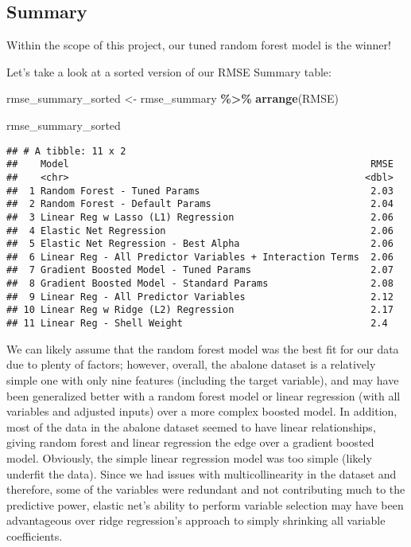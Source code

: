 \documentclass[
]{article}
\newenvironment{Shaded}{\begin{snugshade}}{\end{snugshade}}
\newcommand{\FunctionTok}[1]{\textcolor[rgb]{0.13,0.29,0.53}{\textbf{#1}}}
\newcommand{\NormalTok}[1]{#1}
\newcommand{\OtherTok}[1]{\textcolor[rgb]{0.56,0.35,0.01}{#1}}
\newcommand{\SpecialCharTok}[1]{\textcolor[rgb]{0.81,0.36,0.00}{\textbf{#1}}}
\begin{document}
\hypertarget{summary}{%
\subsection{Summary}\label{summary}}

Within the scope of this project, our tuned random forest model is the
winner!

Let's take a look at a sorted version of our RMSE Summary table:

\begin{Shaded}
\begin{Highlighting}[]
\NormalTok{rmse\_summary\_sorted }\OtherTok{\textless{}{-}}\NormalTok{ rmse\_summary }\SpecialCharTok{\%\textgreater{}\%}
  \FunctionTok{arrange}\NormalTok{(RMSE)}

\NormalTok{rmse\_summary\_sorted}
\end{Highlighting}
\end{Shaded}

\begin{verbatim}
## # A tibble: 11 x 2
##    Model                                                     RMSE
##    <chr>                                                    <dbl>
##  1 Random Forest - Tuned Params                              2.03
##  2 Random Forest - Default Params                            2.04
##  3 Linear Reg w Lasso (L1) Regression                        2.06
##  4 Elastic Net Regression                                    2.06
##  5 Elastic Net Regression - Best Alpha                       2.06
##  6 Linear Reg - All Predictor Variables + Interaction Terms  2.06
##  7 Gradient Boosted Model - Tuned Params                     2.07
##  8 Gradient Boosted Model - Standard Params                  2.08
##  9 Linear Reg - All Predictor Variables                      2.12
## 10 Linear Reg w Ridge (L2) Regression                        2.17
## 11 Linear Reg - Shell Weight                                 2.4
\end{verbatim}

We can likely assume that the random forest model was the best fit for
our data due to plenty of factors; however, overall, the abalone dataset
is a relatively simple one with only nine features (including the target
variable), and may have been generalized better with a random forest
model or linear regression (with all variables and adjusted inputs) over
a more complex boosted model. In addition, most of the data in the
abalone dataset seemed to have linear relationships, giving random
forest and linear regression the edge over a gradient boosted model.
Obviously, the simple linear regression model was too simple (likely
underfit the data). Since we had issues with multicollinearity in the
dataset and therefore, some of the variables were redundant and not
contributing much to the predictive power, elastic net's ability to
perform variable selection may have been advantageous over ridge
regression's approach to simply shrinking all variable coefficients.
\end{document}
